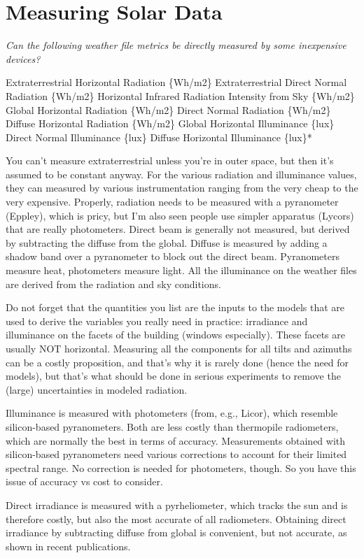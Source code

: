 \section{Measuring Solar Data}\label{measuring-solar-data}

\emph{Can the following weather file metrics be directly measured by some inexpensive devices?}

Extraterrestrial Horizontal Radiation \{Wh/m2\} Extraterrestrial Direct Normal Radiation \{Wh/m2\} Horizontal Infrared Radiation Intensity from Sky \{Wh/m2\} Global Horizontal Radiation \{Wh/m2\} Direct Normal Radiation \{Wh/m2\} Diffuse Horizontal Radiation \{Wh/m2\} Global Horizontal Illuminance \{lux\} Direct Normal Illuminance \{lux\} Diffuse Horizontal Illuminance \{lux\}*

You can't measure extraterrestrial unless you're in outer space, but then it's assumed to be constant anyway. For the various radiation and illuminance values, they can measured by various instrumentation ranging from the very cheap to the very expensive. Properly, radiation needs to be measured with a pyranometer (Eppley), which is pricy, but I'm also seen people use simpler apparatus (Lycors) that are really photometers. Direct beam is generally not measured, but derived by subtracting the diffuse from the global. Diffuse is measured by adding a shadow band over a pyranometer to block out the direct beam. Pyranometers measure heat, photometers measure light. All the illuminance on the weather files are derived from the radiation and sky conditions.

Do not forget that the quantities you list are the inputs to the models that are used to derive the variables you really need in practice: irradiance and illuminance on the facets of the building (windows especially). These facets are usually NOT horizontal. Measuring all the components for all tilts and azimuths can be a costly proposition, and that's why it is rarely done (hence the need for models), but that's what should be done in serious experiments to remove the (large) uncertainties in modeled radiation.

Illuminance is measured with photometers (from, e.g., Licor), which resemble silicon-based pyranometers. Both are less costly than thermopile radiometers, which are normally the best in terms of accuracy. Measurements obtained with silicon-based pyranometers need various corrections to account for their limited spectral range. No correction is needed for photometers, though. So you have this issue of accuracy vs cost to consider.

Direct irradiance is measured with a pyrheliometer, which tracks the sun and is therefore costly, but also the most accurate of all radiometers. Obtaining direct irradiance by subtracting diffuse from global is convenient, but not accurate, as shown in recent publications.
